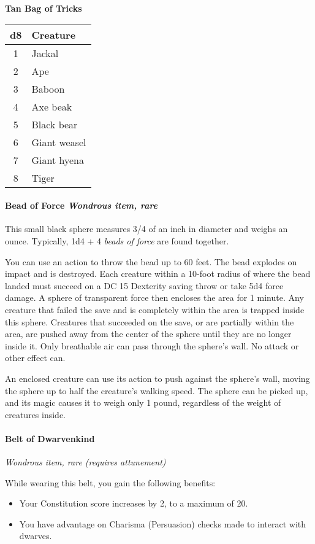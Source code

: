 \documentclass[
]{article}
\begin{document}
\textbf{Tan Bag of Tricks}

\begin{longtable}[]{@{}cl@{}}
\toprule
d8 & Creature\tabularnewline
\midrule
\endhead
1 & Jackal\tabularnewline
2 & Ape\tabularnewline
3 & Baboon\tabularnewline
4 & Axe beak\tabularnewline
5 & Black bear\tabularnewline
6 & Giant weasel\tabularnewline
7 & Giant hyena\tabularnewline
8 & Tiger\tabularnewline
\bottomrule
\end{longtable}

\hypertarget{bead-of-force-wondrous-item-rare}{%
\paragraph{\texorpdfstring{Bead of Force \emph{Wondrous item,
rare}}{Bead of Force Wondrous item, rare}}\label{bead-of-force-wondrous-item-rare}}

This small black sphere measures 3/4 of an inch in diameter and weighs
an ounce. Typically, 1d4 + 4 \emph{beads of force} are found together.

You can use an action to throw the bead up to 60 feet. The bead explodes
on impact and is destroyed. Each creature within a 10-foot radius of
where the bead landed must succeed on a DC 15 Dexterity saving throw or
take 5d4 force damage. A sphere of transparent force then encloses the
area for 1 minute. Any creature that failed the save and is completely
within the area is trapped inside this sphere. Creatures that succeeded
on the save, or are partially within the area, are pushed away from the
center of the sphere until they are no longer inside it. Only breathable
air can pass through the sphere's wall. No attack or other effect can.

An enclosed creature can use its action to push against the sphere's
wall, moving the sphere up to half the creature's walking speed. The
sphere can be picked up, and its magic causes it to weigh only 1 pound,
regardless of the weight of creatures inside.

\hypertarget{belt-of-dwarvenkind}{%
\paragraph{Belt of Dwarvenkind}\label{belt-of-dwarvenkind}}

\emph{Wondrous item, rare (requires attunement)}

While wearing this belt, you gain the following benefits:

\begin{itemize}
\item
  Your Constitution score increases by 2, to a maximum of 20.
\item
  You have advantage on Charisma (Persuasion) checks made to interact
  with dwarves.
\end{itemize}
\end{document}
